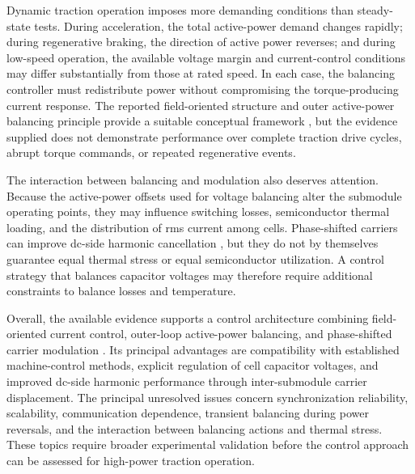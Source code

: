 Dynamic traction operation imposes more demanding conditions than steady-state tests. During acceleration, the total active-power demand changes rapidly; during regenerative braking, the direction of active power reverses; and during low-speed operation, the available voltage margin and current-control conditions may differ substantially from those at rated speed. In each case, the balancing controller must redistribute power without compromising the torque-producing current response. The reported field-oriented structure and outer active-power balancing principle provide a suitable conceptual framework \cite{Jin2017}, but the evidence supplied does not demonstrate performance over complete traction drive cycles, abrupt torque commands, or repeated regenerative events. %

The interaction between balancing and modulation also deserves attention. Because the active-power offsets used for voltage balancing alter the submodule operating points, they may influence switching losses, semiconductor thermal loading, and the distribution of rms current among cells. Phase-shifted carriers can improve dc-side harmonic cancellation \cite{Jin2017}, but they do not by themselves guarantee equal thermal stress or equal semiconductor utilization. A control strategy that balances capacitor voltages may therefore require additional constraints to balance losses and temperature. %

Overall, the available evidence supports a control architecture combining field-oriented current control, outer-loop active-power balancing, and phase-shifted carrier modulation \cite{Jin2017}. Its principal advantages are compatibility with established machine-control methods, explicit regulation of cell capacitor voltages, and improved dc-side harmonic performance through inter-submodule carrier displacement. The principal unresolved issues concern synchronization reliability, scalability, communication dependence, transient balancing during power reversals, and the interaction between balancing actions and thermal stress. These topics require broader experimental validation before the control approach can be assessed for high-power traction operation.